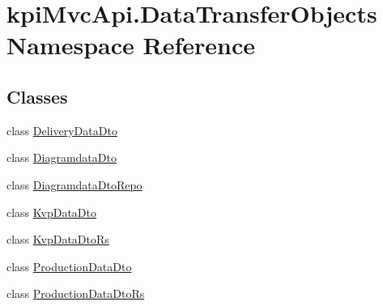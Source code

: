 \hypertarget{namespacekpi_mvc_api_1_1_data_transfer_objects}{}\section{kpi\+Mvc\+Api.\+Data\+Transfer\+Objects Namespace Reference}
\label{namespacekpi_mvc_api_1_1_data_transfer_objects}
\subsection*{Classes}
\begin{DoxyCompactItemize}
\item 
class \hyperlink{classkpi_mvc_api_1_1_data_transfer_objects_1_1_delivery_data_dto}{Delivery\+Data\+Dto}
\item 
class \hyperlink{classkpi_mvc_api_1_1_data_transfer_objects_1_1_diagramdata_dto}{Diagramdata\+Dto}
\item 
class \hyperlink{classkpi_mvc_api_1_1_data_transfer_objects_1_1_diagramdata_dto_repo}{Diagramdata\+Dto\+Repo}
\item 
class \hyperlink{classkpi_mvc_api_1_1_data_transfer_objects_1_1_kvp_data_dto}{Kvp\+Data\+Dto}
\item 
class \hyperlink{classkpi_mvc_api_1_1_data_transfer_objects_1_1_kvp_data_dto_rs}{Kvp\+Data\+Dto\+Rs}
\item 
class \hyperlink{classkpi_mvc_api_1_1_data_transfer_objects_1_1_production_data_dto}{Production\+Data\+Dto}
\item 
class \hyperlink{classkpi_mvc_api_1_1_data_transfer_objects_1_1_production_data_dto_rs}{Production\+Data\+Dto\+Rs}
\end{DoxyCompactItemize}
